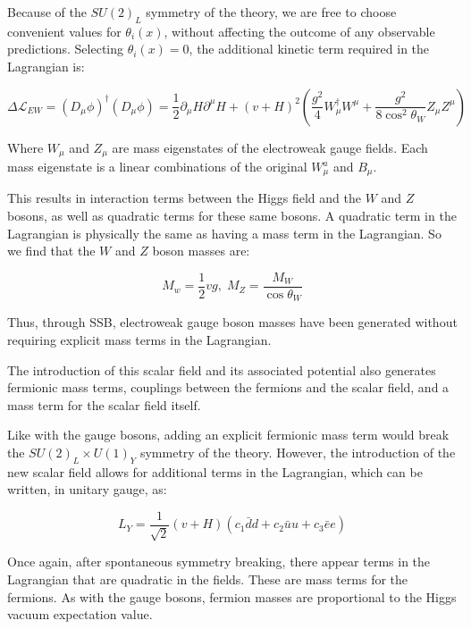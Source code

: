 Because of the $SU(2)_L$ symmetry of the theory, we are free to choose convenient values for $\theta_i(x)$,
without affecting the outcome of any observable predictions.
Selecting $\theta_i(x) = 0$, the additional kinetic term required in the Lagrangian is:

\begin{equation}\label{eq:higgs_kinetic}
    \Delta\mathcal{L}_{EW} = \left(D_{\mu}\phi\right)^{\dagger}\left(D_{\mu}\phi\right)
    =\frac{1}{2}\partial_{\mu}H \partial^{\mu}H + (v+H)^{2}\left(\frac{g^2}{4}W_\mu^\dagger W^\mu
    + \frac{g^2}{8\cos^2 {\theta_W}}Z_\mu Z^\mu\right)
\end{equation}

Where $W_\mu$ and $Z_\mu$ are mass eigenstates of the electroweak gauge fields.
Each mass eigenstate is a linear combinations of the original $W_\mu^a$ and $B_\mu$.

This results in interaction terms between the Higgs field and the $W$ and $Z$ bosons,
as well as quadratic terms for these same bosons.
A quadratic term in the Lagrangian is physically the same as having a mass term in the Lagrangian.
So we find that the $W$ and $Z$ boson masses are:

\begin{equation}\label{eq:wz_masses}
    M_w = \frac{1}{2}vg,\; M_Z = \frac{M_W}{\cos{\theta_W}}
\end{equation}

Thus, through SSB, electroweak gauge boson masses have been generated without requiring explicit mass terms in the Lagrangian.

The introduction of this scalar field and its associated potential also generates fermionic mass terms,
couplings between the fermions and the scalar field, and a mass term for the scalar field itself.

Like with the gauge bosons, adding an explicit fermionic mass term would break the $SU(2)_L \times U(1)_Y$ symmetry of the theory.
However, the introduction of the new scalar field allows for additional terms in the Lagrangian,
which can be written, in unitary gauge, as:

\begin{equation}\label{ew:yukawa_lagrangian}
    L_Y = \frac{1}{\sqrt{2}}\left(v+H\right)\left(c_{1}\bar{d}d+c_2\bar{u}u+c_3\bar{e}e\right)
\end{equation}

Once again, after spontaneous symmetry breaking, there appear terms in the Lagrangian that are quadratic in the fields.
These are mass terms for the fermions.
As with the gauge bosons, fermion masses are proportional to the Higgs vacuum expectation value.

